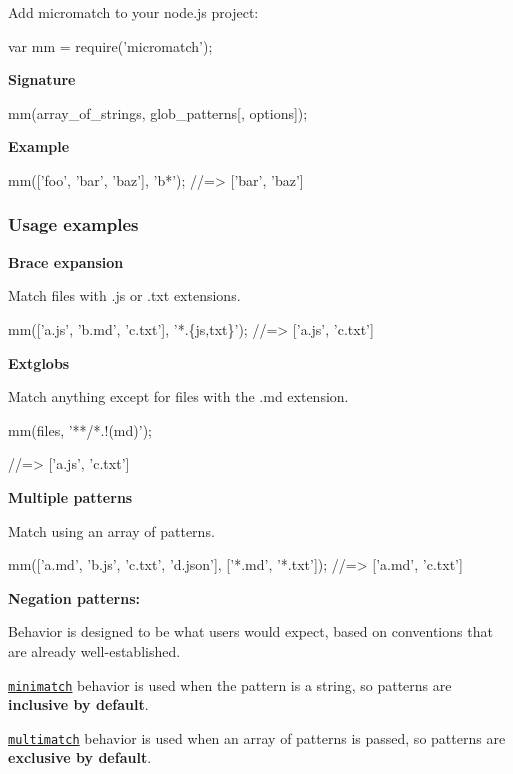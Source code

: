Add micromatch to your node.\+js project\+:


\begin{DoxyCode}
var mm = require('micromatch');
\end{DoxyCode}


{\bfseries Signature}


\begin{DoxyCode}
mm(array\_of\_strings, glob\_patterns[, options]);
\end{DoxyCode}


{\bfseries Example}


\begin{DoxyCode}
mm(['foo', 'bar', 'baz'], 'b*');
//=> ['bar', 'baz']
\end{DoxyCode}


\subsubsection*{Usage examples}

{\bfseries Brace expansion}

Match files with {\ttfamily .js} or {\ttfamily .txt} extensions.


\begin{DoxyCode}
mm(['a.js', 'b.md', 'c.txt'], '*.\{js,txt\}');
//=> ['a.js', 'c.txt']
\end{DoxyCode}


{\bfseries Extglobs}

Match anything except for files with the {\ttfamily .md} extension.


\begin{DoxyCode}
mm(files, '**/*.!(md)');

//=> ['a.js', 'c.txt']
\end{DoxyCode}


{\bfseries Multiple patterns}

Match using an array of patterns.


\begin{DoxyCode}
mm(['a.md', 'b.js', 'c.txt', 'd.json'], ['*.md', '*.txt']);
//=> ['a.md', 'c.txt']
\end{DoxyCode}


{\bfseries Negation patterns\+:}

Behavior is designed to be what users would expect, based on conventions that are already well-\/established.


\begin{DoxyItemize}
\item \href{https://github.com/isaacs/minimatch}{\tt minimatch} behavior is used when the pattern is a string, so patterns are {\bfseries inclusive by default}.
\item \href{https://github.com/sindresorhus/multimatch}{\tt multimatch} behavior is used when an array of patterns is passed, so patterns are {\bfseries exclusive by default}.
\end{DoxyItemize}


